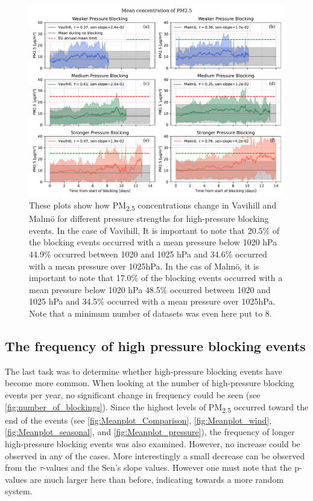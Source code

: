 \begin{figure}[H]
    \centering
    \includegraphics[width=\textwidth]{Figures/Meanplot_pressure.pdf}
    \caption{These plots show how PM\textsubscript{2.5} concentrations change in Vavihill and Malmö for different pressure strengths for high-pressure blocking events. In the case of Vavihill, It is important to note that 20.5\% of the blocking events occurred with a mean pressure below 1020 hPa 44.9\% occurred between 1020 and 1025 hPa and 34.6\% occurred with a mean pressure over 1025hPa. In the cas of Malmö, it is important to note that 17.0\% of the blocking events occurred with a mean pressure below 1020 hPa 48.5\% occurred between 1020 and 1025 hPa and 34.5\% occurred with a mean pressure over 1025hPa. Note that a minimum number of datasets was even here put to 8.}
    \label{fig:Meanplot_pressure}
\end{figure}




\subsection{The frequency of high pressure blocking events}
The last task was to determine whether high-pressure blocking events have become more common. When looking at the number of high-pressure blocking events per year, no significant change in frequency could be seen (see \autoref{fig:number_of_blockings}). Since the highest levels of PM\textsubscript{2.5} occurred toward the end of the events (see \autoref{fig:Meanplot_Comparison}, \autoref{fig:Meanplot_wind}, \autoref{fig:Meanplot_seasonal}, and \autoref{fig:Meanplot_pressure}), the frequency of longer high-pressure blocking events was also examined. However, no increase could be observed in any of the cases. More interestingly a small decrease can be observed from the $\tau$-values and the Sen's slope values. However one must note that the p-values are much larger here than before, indicating towards a more random system. 

